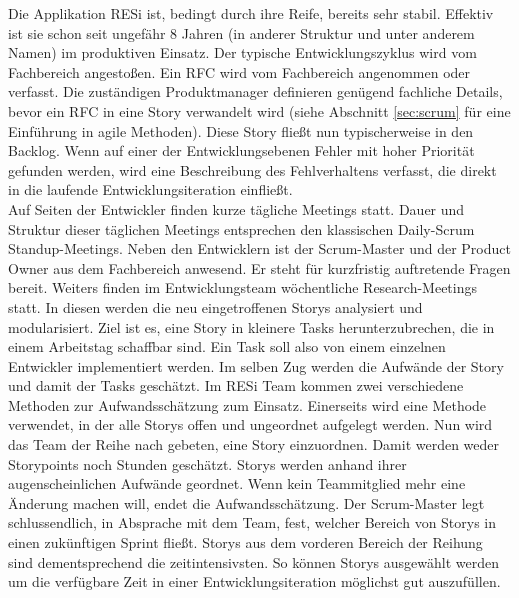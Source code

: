 Die Applikation RESi ist, bedingt durch ihre Reife, bereits sehr stabil. Effektiv ist sie schon seit ungefähr 8 Jahren (in anderer Struktur und unter anderem Namen) im produktiven Einsatz. Der typische Entwicklungszyklus wird vom Fachbereich angestoßen. Ein \gls{RFC} wird vom Fachbereich angenommen oder verfasst. Die zuständigen Produktmanager definieren genügend fachliche Details, bevor ein \gls{RFC} in eine \gls{Story} verwandelt wird (siehe Abschnitt \ref{sec:scrum} für eine Einführung in agile Methoden). Diese \gls{Story} fließt nun typischerweise in den \gls{Backlog}. Wenn auf einer der Entwicklungsebenen Fehler mit hoher Priorität gefunden werden, wird eine Beschreibung des Fehlverhaltens verfasst, die direkt in die laufende Entwicklungsiteration einfließt.\\
Auf Seiten der Entwickler finden kurze tägliche Meetings statt. Dauer und Struktur dieser täglichen Meetings entsprechen den klassischen Daily-Scrum Standup-Meetings. Neben den Entwicklern ist der Scrum-Master und der Product Owner aus dem Fachbereich anwesend. Er steht für kurzfristig auftretende Fragen bereit. Weiters finden im Entwicklungsteam wöchentliche Research-Meetings statt. In diesen werden die neu eingetroffenen Storys analysiert und modularisiert. Ziel ist es, eine Story in kleinere Tasks herunterzubrechen, die in einem Arbeitstag schaffbar sind. Ein Task soll also von einem einzelnen Entwickler implementiert werden. Im selben Zug werden die Aufwände der Story und damit der Tasks geschätzt. Im RESi Team kommen zwei verschiedene Methoden zur Aufwandsschätzung zum Einsatz. Einerseits wird eine Methode verwendet, in der alle Storys offen und ungeordnet aufgelegt werden. Nun wird das Team der Reihe nach gebeten, eine Story einzuordnen. Damit werden weder Storypoints noch Stunden geschätzt. Storys werden anhand ihrer augenscheinlichen Aufwände geordnet. Wenn kein Teammitglied mehr eine Änderung machen will, endet die Aufwandsschätzung. Der Scrum-Master legt schlussendlich, in Absprache mit dem Team, fest, welcher Bereich von Storys in einen zukünftigen Sprint fließt. Storys aus dem vorderen Bereich der Reihung sind dementsprechend die zeitintensivsten. So können Storys ausgewählt werden um die verfügbare Zeit in einer Entwicklungsiteration möglichst gut auszufüllen.

